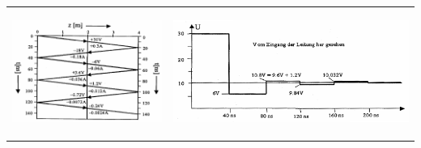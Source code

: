 \begin{tabular}{p{9cm}p{9cm}}
\begin{minipage}{8cm}
			\includegraphics[height=4.1cm]{./bilder/Leitungen_MFReflx_EnAP_SnAP_RaumZeit.png}    	    
	    \end{minipage}
		&
		\begin{minipage}{8cm}
			\includegraphics[height=4.1cm]{./bilder/Leitungen_MFReflx_EnAP_SnAP_Eingangsspannung.png}      	
	    \end{minipage}
	\end{tabular}

    